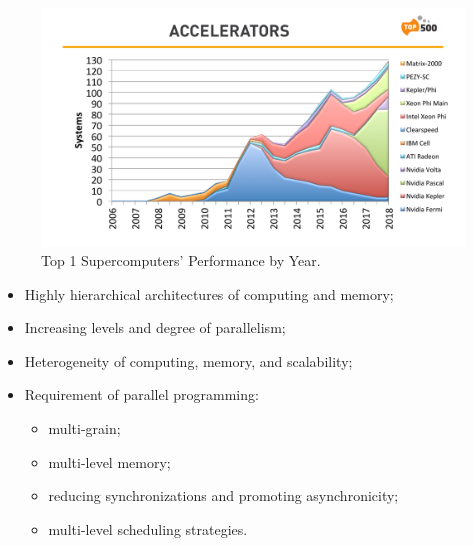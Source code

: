 \begin{figure}[htbp]
	\centering
	\includegraphics[width=6.6in]{fig/top500.pdf}
	\caption{Top 1 Supercomputers' Performance by Year.}
	\label{top500-acc}
\end{figure}

\begin{itemize}
	\item Highly hierarchical architectures of computing and memory;
	\item Increasing levels and degree of parallelism;
	\item Heterogeneity of computing, memory, and scalability;
	\item Requirement of parallel programming:
	\begin{itemize}
		\item multi-grain;
		\item multi-level memory;
		\item reducing synchronizations and promoting asynchronicity;
		\item multi-level scheduling strategies.
	\end{itemize}
\end{itemize}


\clearemptydoublepage